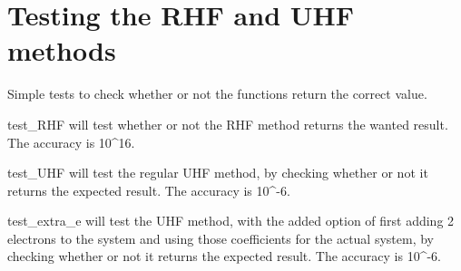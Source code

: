 \documentclass[letterpaper,10pt,english]{sphinxmanual}
\begin{document}
\label{\detokenize{tests:module-ghf.tests.test_auth}}

\chapter{Testing the RHF and UHF methods}
\label{\detokenize{tests:testing-the-rhf-and-uhf-methods}}\label{\detokenize{tests::doc}}
Simple tests to check whether or not the functions return the correct value.

\begin{fulllineitems}
\label{\detokenize{tests:ghf.tests.test_auth.test_RHF}}
test\_RHF will test whether or not the RHF method returns the wanted result. The accuracy is 10\textasciicircum{}16.

\end{fulllineitems}


\begin{fulllineitems}
\label{\detokenize{tests:ghf.tests.test_auth.test_UHF}}
test\_UHF will test the regular UHF method, by checking whether or not it returns the expected result. The accuracy is 10\textasciicircum{}-6.

\end{fulllineitems}


\begin{fulllineitems}
\label{\detokenize{tests:ghf.tests.test_auth.test_extra_e}}
test\_extra\_e will test the UHF method, with the added option of first adding 2 electrons to the system and using those coefficients
for the actual system, by checking whether or not it returns the expected result. The accuracy is 10\textasciicircum{}-6.

\end{fulllineitems}
\end{document}
